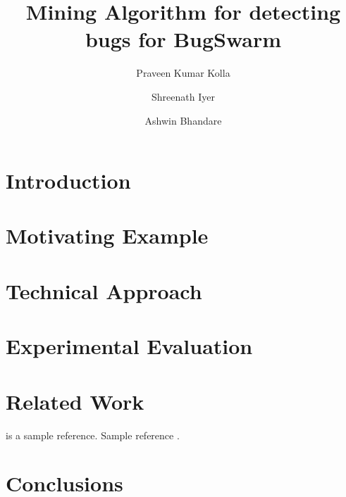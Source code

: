 \documentclass[preprint,nocopyrightspace]{sig-alternate}
\begin{document}
%

\title{Mining Algorithm for detecting bugs for BugSwarm}

\author{Praveen Kumar Kolla}
\author{Shreenath Iyer}
\author{Ashwin Bhandare}


\maketitle

\begin{abstract}


\end{abstract}

\section{Introduction}

\section{Motivating Example}

\section{Technical Approach}

\section{Experimental Evaluation}

\section{Related Work}
\citet{DBLP:conf/sc/Rubio-GonzalezNNDKSBIH13} is a sample reference.
Sample reference \cite{DBLP:conf/sc/Rubio-GonzalezNNDKSBIH13}.

\section{Conclusions}


\end{document}
